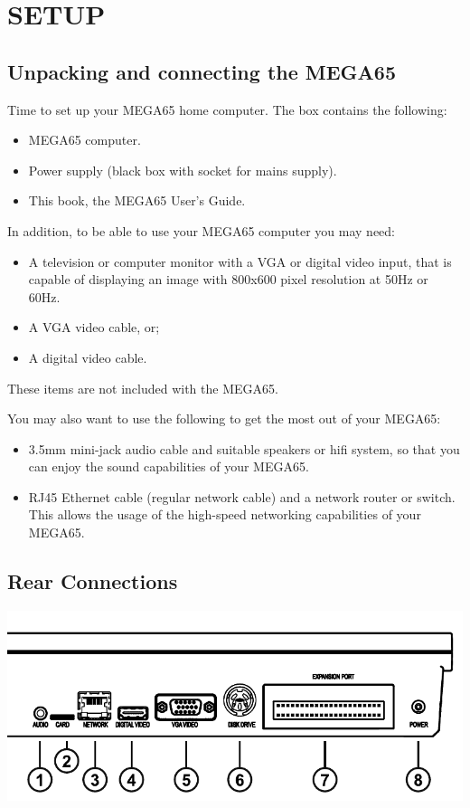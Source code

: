 \chapter{SETUP}
\section{Unpacking and connecting the MEGA65}

Time to set up your MEGA65 home computer.
The box contains the following:
\begin{itemize}
\setlength\itemsep{-0.75mm}
\item MEGA65 computer.
\item Power supply (black box with socket for mains supply).
\item This book, the MEGA65 User's Guide.
\end{itemize}

In addition, to be able to use your MEGA65 computer you may need:
\begin{itemize}
\item A television or computer monitor with a VGA or digital video input, that is capable of displaying an image with 800x600 pixel resolution at 50Hz or 60Hz.
\item A VGA video cable, or;
\item A digital video cable.
\end{itemize}

These items are not included with the MEGA65.

You may also want to use the following to get the most out of your MEGA65:
\begin{itemize}
\item 3.5mm mini-jack audio cable and suitable speakers or hifi system, so that you can enjoy the sound capabilities of your MEGA65.
\item RJ45 Ethernet cable (regular network cable) and a network router or switch. This allows the usage of the high-speed networking capabilities of your MEGA65.
\end{itemize}

\section{Rear Connections}

\includegraphics[width=\linewidth]{images/illustrations/mega65-rear.pdf}

